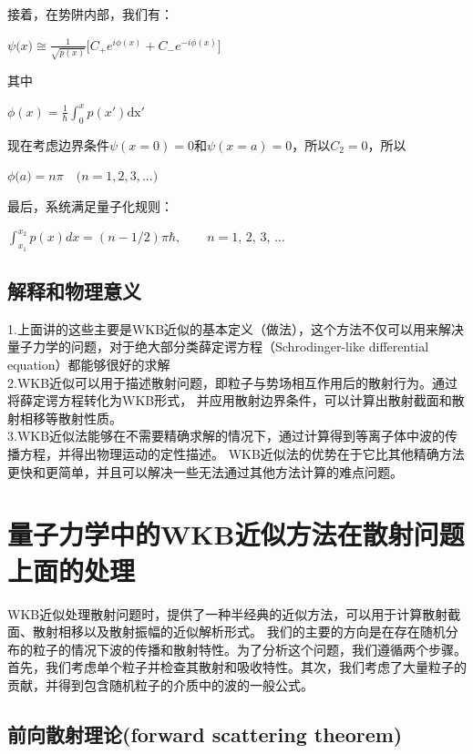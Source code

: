 \documentclass[12pt, a4paper, oneside]{ctexart}
\begin{document}
\begin{spacing}{2.0}
接着，在势阱内部，我们有：
\begin{center}
    $\displaystyle\psi\big(x\big)\cong\frac{1}{\sqrt{p(x)}}\biggl[C_+e^{i\phi(x)}+C_-e^{-i\phi(x)}\biggr]$
\end{center}
其中
\begin{center}
    $\displaystyle \phi(x) = \frac{1}{\hbar}\int_0^xp(x')\mathrm{dx'}$
\end{center}
现在考虑边界条件$\psi(x=0)=0$和$\psi(x=a)=0$，所以$C_2=0$，所以
\begin{center}
    $\phi\bigl(a\bigr)=n\pi\quad\bigl(n=1,2,3,...\bigr)$
\end{center}
最后，系统满足量子化规则：
\begin{center}
    $\displaystyle \int_{x_1}^{x_2} p(x)dx =(n - 1/2)\pi\hbar,\qquad n=1,\,2,\,3,\,\dots\,\!$
\end{center}

\subsection{解释和物理意义}
1.上面讲的这些主要是WKB近似的基本定义（做法），这个方法不仅可以用来解决量子力学的问题，对于绝大部分类薛定谔方程（Schrodinger-like differential equation）都能够很好的求解
\\
2.WKB近似可以用于描述散射问题，即粒子与势场相互作用后的散射行为。通过将薛定谔方程转化为WKB形式，
并应用散射边界条件，可以计算出散射截面和散射相移等散射性质。
\\
3.WKB近似法能够在不需要精确求解的情况下，通过计算得到等离子体中波的传播方程，并得出物理运动的定性描述。
WKB近似法的优势在于它比其他精确方法更快和更简单，并且可以解决一些无法通过其他方法计算的难点问题。

\section{量子力学中的WKB近似方法在散射问题上面的处理}
WKB近似处理散射问题时，提供了一种半经典的近似方法，可以用于计算散射截面、散射相移以及散射振幅的近似解析形式。
我们的主要的方向是在存在随机分布的粒子的情况下波的传播和散射特性。为了分析这个问题，我们遵循两个步骤。\cite{5472149}
首先，我们考虑单个粒子并检查其散射和吸收特性。其次，我们考虑了大量粒子的贡献，并得到包含随机粒子的介质中的波的一般公式。

\subsection{前向散射理论(forward scattering theorem)}


\end{spacing}
\end{document}
